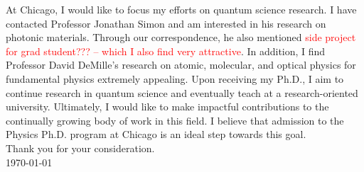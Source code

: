 \documentclass[12pt]{article}
\begin{document}
At Chicago, I would like to focus my efforts on quantum science research. I have contacted Professor Jonathan Simon and am interested in his research on photonic materials. Through our correspondence, he also mentioned \textcolor{red}{side project for grad student??? -- which I also find very attractive}. In addition, I find Professor David DeMille's research on atomic, molecular, and optical physics for fundamental physics extremely appealing. Upon receiving my Ph.D., I aim to continue research in quantum science and eventually teach at a research-oriented university. Ultimately, I would like to make impactful contributions to the continually growing body of work in this field. I believe that admission to the Physics Ph.D. program at Chicago is an ideal step towards this goal. \\

\noindent Thank you for your consideration. \\

\noindent \today
	











	
	
	
	
	
\end{document}
